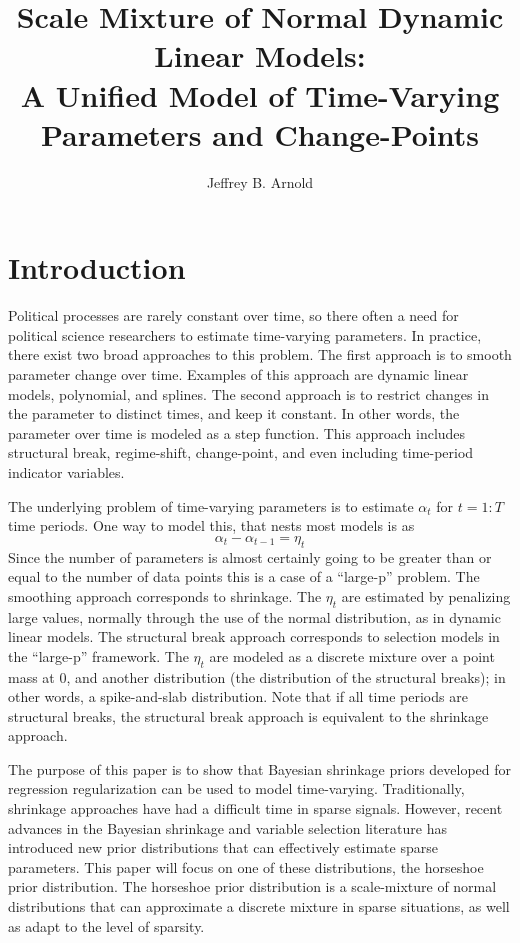 \documentclass{article}
\author{Jeffrey B. Arnold}
\title{Scale Mixture of Normal Dynamic Linear Models: \\
  A Unified Model of Time-Varying Parameters and Change-Points}
\begin{document}
\maketitle{}

\section{Introduction}
\label{sec:introduction}

Political processes are rarely constant over time, so there often a need for political science researchers to estimate time-varying parameters. 
In practice, there exist two broad approaches to this problem.
The first approach is to smooth parameter change over time.
Examples of this approach are dynamic linear models, polynomial, and splines.
The second approach is to restrict changes in the parameter to distinct times, and keep it constant. 
In other words, the parameter over time is modeled as a step function. 
This approach includes structural break, regime-shift, change-point, and even including time-period indicator variables.

The underlying problem of time-varying parameters is to estimate $\alpha_{t}$ for $t = 1:T$ time periods. 
One way to model this, that nests most models is as 
\begin{equation}
  \label{eq:7}
  \alpha_{t} - \alpha_{t-1}  = \eta_{t}
\end{equation}
Since the number of parameters is almost certainly going to be greater than or equal to the number of data points this is a case of a ``large-p'' problem.
The smoothing approach corresponds to shrinkage.
The $\eta_{t}$ are estimated by penalizing large values, normally through the use of the normal distribution, as in dynamic linear models.
The structural break approach corresponds to selection models in the ``large-p'' framework.
The $\eta_{t}$ are modeled as a discrete mixture over a point mass at 0, and another distribution (the distribution of the structural breaks); in other words, a spike-and-slab distribution.
Note that if all time periods are structural breaks, the structural break approach is equivalent to the shrinkage approach.

The purpose of this paper is to show that Bayesian shrinkage priors developed for regression regularization can be used to model time-varying.
Traditionally, shrinkage approaches have had a difficult time in sparse signals.
However, recent advances in the Bayesian shrinkage and variable selection literature has introduced new prior distributions that can effectively estimate sparse parameters. 
This paper will focus on one of these distributions, the horseshoe prior distribution.
The horseshoe prior distribution is a scale-mixture of normal distributions that can approximate a discrete mixture in sparse situations, as well as adapt to the level of sparsity.
\end{document}
